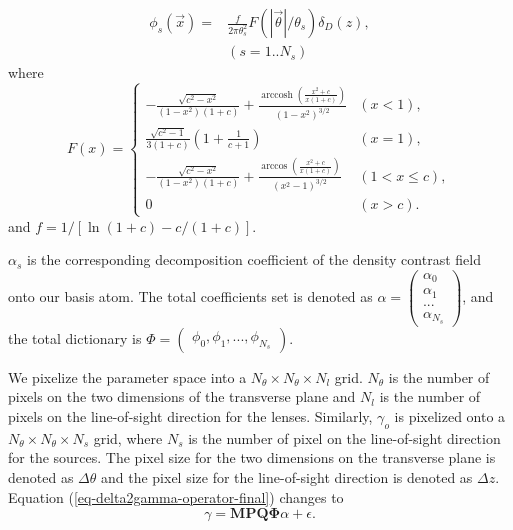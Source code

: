 \documentclass[twocolumn]{aastex62}
\DeclareMathOperator{\arccosh}{arccosh}
\begin{document}
\begin{equation}
\begin{split}
\phi_s(\vec{x}) =&\frac{f }{2 \pi \theta_s^2 } F(|\vec{\theta}|/\theta_s) \delta_D(z),\\
&  (s=1..N_s)
\end{split}
\end{equation}
where
\begin{equation}
F(x)=
\begin{cases}
-\frac{\sqrt{c^2-x^2}}{(1-x^2)(1+c)} + \frac{\arccosh \left(\frac{x^2+c}{x(1+c)}\right)}{(1-x^2)^{3/2}}  & (x<1),\\
\frac{\sqrt{c^2-1}}{3(1+c)} (1+\frac{1}{c+1}) & (x=1),\\
-\frac{\sqrt{c^2-x^2}}{(1-x^2)(1+c)} + \frac{\arccos\left(\frac{x^2+c}{x(1+c)}\right)}{(x^2-1)^{3/2}} & (1<x\leq c),\\
0& (x>c).
\end{cases}
\end{equation}
and $f=1/[\ln (1+c)-c/(1+c)]$.

$\alpha_s$ is the corresponding decomposition coefficient of the density contrast field onto our basis atom. The total coefficients set is denoted as $\alpha=\begin{pmatrix}
\alpha_0\\
\alpha_1\\
...\\
\alpha_{N_s}
\end{pmatrix}$, and the total dictionary is $\Phi=\begin{pmatrix}
\phi_0, \phi_1, ..., \phi_{N_s}
\end{pmatrix}$.

We pixelize the parameter space into a $N_\theta \times N_\theta \times N_l$ grid. $N_\theta$ is the number of pixels on the two dimensions of the transverse plane and $N_l$ is the number of pixels on the line-of-sight direction for the lenses. Similarly, $\gamma_o$ is pixelized onto a $N_\theta \times N_\theta \times N_s$ grid, where $N_s$ is the number of pixel on the line-of-sight direction for the sources.
The pixel size for the two dimensions on the transverse plane is denoted as $\Delta \theta$ and the pixel size for the line-of-sight direction is denoted as $\Delta z$.
Equation (\ref{eq-delta2gamma-operator-final}) changes to
\begin{equation}\label{eq-alpha2gamma-operator}
\gamma=\mathbf{M}\mathbf{P}\mathbf{Q}\mathbf{\Phi} \alpha +\epsilon.
\end{equation}
\end{document}
